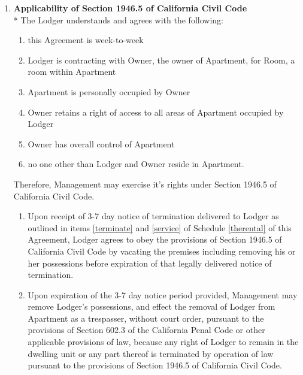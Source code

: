 \documentclass[12pt,letterpaper]{article}
\newcommand{\management}{Management}
\newcommand{\apt}{Apartment}
\newcommand{\room}{Room}
\begin{document}
	\begin{enumerate}
		\item \textbf{Applicability of Section 1946.5 of California Civil Code}\\*
			The Lodger understands and agrees with the following:
			\begin{enumerate}
				\item this Agreement is week-to-week
				\item Lodger is contracting with Owner, the owner of \apt{}, for \room{}, a room within \apt{}
				\item \apt{} is personally occupied by Owner
				\item Owner retains a right of access to all areas of \apt{} occupied by Lodger 
				\item Owner has overall control of \apt{} 
				\item no one other than Lodger and Owner reside in \apt{}. 
			\end{enumerate}
			Therefore, \management{} may exercise it's rights under Section 1946.5 of California Civil Code.
			\begin{enumerate}
				\item Upon receipt of 3-7 day notice of termination delivered to Lodger as outlined in items \ref{terminate} and \ref{service} of Schedule \ref{therental} of this Agreement, Lodger agrees to obey the provisions of Section 1946.5 of California Civil Code by vacating the premises including removing his or her possessions before expiration of that legally delivered notice of termination.
				\item Upon expiration of the 3-7 day notice period provided, \management{} may remove Lodger's possessions, and effect the removal of Lodger from \apt{} as a trespasser, without court order, pursuant to the provisions of Section 602.3 of the California Penal Code or other applicable provisions of law, because any right of Lodger to remain in the dwelling unit or any part thereof is terminated by operation of law pursuant to the provisions of Section 1946.5 of California Civil Code.
			\end{enumerate} 
	

\end{enumerate}
\end{document}
